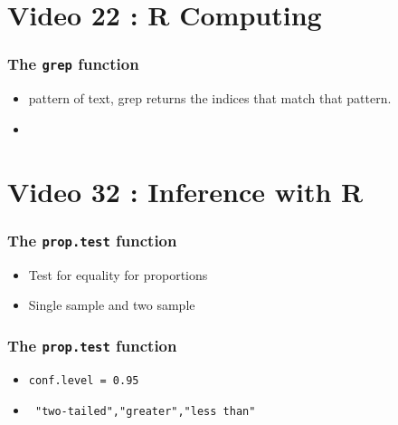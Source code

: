 \section{Video 22 :  R Computing}
\begin{frame}[fragile]
\frametitle{The \texttt{grep} function}
\begin{itemize}
\item pattern of text, grep returns the indices  that match that pattern.
\item
\end{itemize}

\end{frame}
\section{Video 32 : Inference with R}
\begin{frame}[fragile]
\frametitle{The \texttt{prop.test} function}
\begin{itemize}
\item Test for equality for proportions
\item Single sample and two sample 
\end{itemize}
\end{frame}
\begin{frame}[fragile]
\frametitle{The \texttt{prop.test} function}
\begin{itemize}
\item \texttt{conf.level = 0.95}
\item \texttt{ "two-tailed","greater","less than"}
\end{itemize}
\end{frame}


